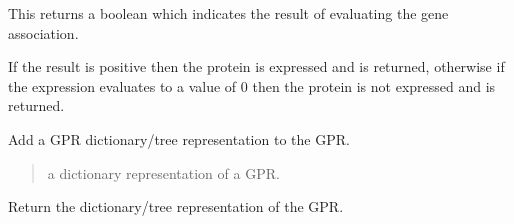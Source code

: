 \documentclass[letterpaper,12pt,english]{sphinxmanual}
\begin{document}
\begin{fulllineitems}
\begin{fulllineitems}
\end{fulllineitems}


\begin{fulllineitems}
\label{\detokenize{api/core:cbmpy.CBModel.GeneProteinAssociation.isProteinActive}}
\pysigstartsignatures
\pysiglinewithargsret
{}
{}
{}
\pysigstopsignatures
\sphinxAtStartPar
This returns a boolean which indicates the result of evaluating the gene
association.

\sphinxAtStartPar
If the result is positive then the protein is expressed and  is returned,
otherwise if the expression evaluates to a value of 0 then the protein is not
expressed and   is returned.

\end{fulllineitems}


\begin{fulllineitems}
\label{\detokenize{api/core:cbmpy.CBModel.GeneProteinAssociation.setTree}}
\pysigstartsignatures
\pysiglinewithargsret
{}
{}
{}
\pysigstopsignatures
\sphinxAtStartPar
Add a GPR dictionary/tree representation to the GPR.
\begin{quote}\begin{description}
\sphinxAtStartPar
{} \textendash{} a dictionary representation of a GPR.

\end{description}\end{quote}

\end{fulllineitems}


\begin{fulllineitems}
\label{\detokenize{api/core:cbmpy.CBModel.GeneProteinAssociation.getTree}}
\pysigstartsignatures
\pysiglinewithargsret
{}
{}
{}
\pysigstopsignatures
\sphinxAtStartPar
Return the dictionary/tree representation of the GPR.


\end{fulllineitems}
\end{fulllineitems}
\end{document}
